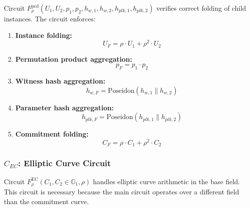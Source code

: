 \documentclass[11pt,a4paper]{article}
\theoremstyle{plain}
\theoremstyle{definition}
\newcommand{\G}{\mathbb{G}}
\begin{document}
Circuit $F^{\text{pcd}}_{\rho}(U_1, U_2, p_1, p_2, h_{w,1}, h_{w,2}, h_{plk,1}, h_{plk,2})$ verifies correct folding of child instances. The circuit enforces:

\begin{tcolorbox}[title=Inner Node Folding Circuit Constraints]
\begin{enumerate}[itemsep=5pt]
\item \textbf{Instance folding:}
\begin{equation}
U_F = \rho \cdot U_1 + \rho^2 \cdot U_2
\end{equation}

\item \textbf{Permutation product aggregation:}
\begin{equation}
p_F = p_1 \cdot p_2
\end{equation}

\item \textbf{Witness hash aggregation:}
\begin{equation}
h_{w,F} = \text{Poseidon}(h_{w,1} \| h_{w,2})
\end{equation}

\item \textbf{Parameter hash aggregation:}
\begin{equation}
h_{plk,F} = \text{Poseidon}(h_{plk,1} \| h_{plk,2})
\end{equation}

\item \textbf{Commitment folding:}
\begin{equation}
C_F = \rho \cdot C_1 + \rho^2 \cdot C_2
\end{equation}
\end{enumerate}
\end{tcolorbox}

\subsubsection{$C_{EC}$: Elliptic Curve Circuit}

Circuit $F^{\text{EC}}_{\rho}(C_1, C_2 \in \G_1, \rho)$ handles elliptic curve arithmetic in the base field. This circuit is necessary because the main circuit operates over a different field than the commitment curve.
\end{document}
